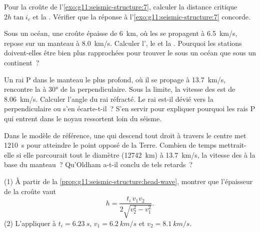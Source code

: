 \begin{exercise}[$\star\star$]\label{exo:g11:seismic-structure:8}
Pour la croûte de l'\cref{exo:g11:seismic-structure:7}, calculer la
distance critique $2h\tan i_c$ et la . Vérifier que la
réponse à l'\cref{exo:g11:seismic-structure:7} concorde.
\end{exercise}

\begin{exercise}[$\star\star$]\label{exo:g11:seismic-structure:9}
Sous un océan, une croûte épaisse de \qty{6}{km}, où les  se
propagent à \qty{6.5}{km/s}, repose sur un manteau à \qty{8.0}{km/s}.
Calculer l', le  et la . Pourquoi les stations doivent-elles être bien plus rapprochées
pour trouver le  sous un océan que sous un continent~?
\end{exercise}

\begin{exercise}[$\star\star$]\label{exo:g11:seismic-structure:10}
Un rai P dans le manteau le plus profond, où il se propage à
\qty{13.7}{km/s}, rencontre la  à \ang{30} de la
perpendiculaire. Sous la limite, la vitesse des  est de
\qty{8.06}{km/s}. Calculer l'angle du rai réfracté. Le rai est-il dévié vers
la perpendiculaire ou s'en écarte-t-il~? S'en servir pour expliquer pourquoi
les rais P qui entrent dans le noyau ressortent loin du séisme.
\end{exercise}

\begin{exercise}[$\star\star$]\label{exo:g11:seismic-structure:11}
Dans le modèle de référence, une  qui descend tout droit à travers le
centre met \qty{1210}{s} pour atteindre le point opposé de la Terre. Combien
de temps mettrait-elle si elle parcourait tout le diamètre
(\qty{12742}{km}) à \qty{13.7}{km/s}, la vitesse des  à la base du
manteau~? Qu'Oldham a-t-il conclu de tels retards~?
\end{exercise}

\begin{exercise}[$\star\star\star$]\label{exo:g11:seismic-structure:12}
(1) À partir de la \cref{prop:g11:seismic-structure:head-wave}, montrer que
l'épaisseur de la croûte vaut
\[
  h = \frac{t_i\,v_1 v_2}{2\sqrt{v_2^2 - v_1^2}}.
\]
(2) L'appliquer à $t_i = \qty{6.23}{s}$, $v_1 = \qty{6.2}{km/s}$ et
$v_2 = \qty{8.1}{km/s}$.
\end{exercise}

